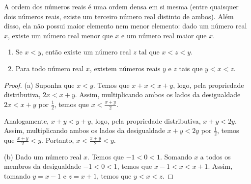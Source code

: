 A ordem dos números reais é uma ordem densa em si mesma (entre quaisquer dois números reais, existe um terceiro número real distinto de ambos).
Além disso, ela não possui maior elemento nem menor elemento: dado um número real $x$, existe um número real menor que $x$ e um número real maior que $x$.
\begin{proposition}
    \begin{enumerate}[label=(\alph*)]
        \item Se $x<y$, então existe um número real $z$ tal que $x<z<y$.
        \item Para todo número real $x$, existem números reais $y$ e $z$ tais que $y<x<z$.
    \end{enumerate}
\end{proposition}
\begin{proof}
    (a) Suponha que $x<y$.
    Temos que $x+x<x+y$, logo, pela propriedade distributiva, $2x<x+y$.
    Assim, multiplicando ambos os lados da desigualdade $2x<x+y$ por $\frac{1}{2}$, temos que $x<\frac{x+y}{2}$.
    
    Analogamente, $x+y<y+y$, logo, pela propriedade distributiva, $x+y<2y$.
    Assim, multiplicando ambos os lados da desigualdade $x+y<2y$ por $\frac{1}{2}$, temos que $\frac{x+y}{2}<y$.
    Portanto, $x<\frac{x+y}{2}<y$.

    (b) Dado um número real $x$.
    Temos que $-1<0<1$.
    Somando $x$ a todos os membros da desigualdade $-1<0<1$, temos que $x-1<x<x+1$.
    Assim, tomando $y=x-1$ e $z=x+1$, temos que $y<x<z$.
\end{proof}
